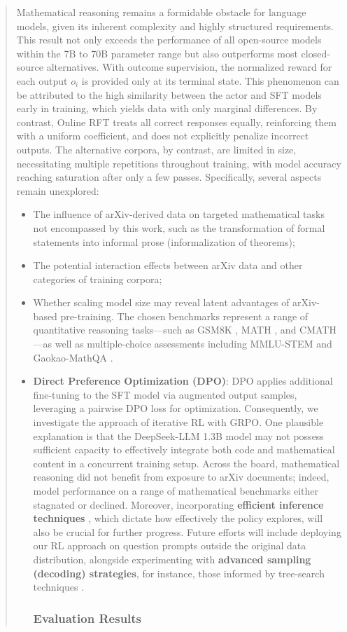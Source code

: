 \begin{abstract}
Mathematical reasoning remains a formidable obstacle for language models, given its inherent complexity and highly structured requirements. This result not only exceeds the performance of all open-source models within the 7B to 70B parameter range but also outperforms most closed-source alternatives. With outcome supervision, the normalized reward for each output $o_i$ is provided only at its terminal state. This phenomenon can be attributed to the high similarity between the actor and SFT models early in training, which yields data with only marginal differences. By contrast, Online RFT treats all correct responses equally, reinforcing them with a uniform coefficient, and does not explicitly penalize incorrect outputs. The alternative corpora, by contrast, are limited in size, necessitating multiple repetitions throughout training, with model accuracy reaching saturation after only a few passes. Specifically, several aspects remain unexplored:

\begin{itemize}[topsep=0pt]
    \item The influence of arXiv-derived data on targeted mathematical tasks not encompassed by this work, such as the transformation of formal statements into informal prose (informalization of theorems);
    \item The potential interaction effects between arXiv data and other categories of training corpora;
    \item Whether scaling model size may reveal latent advantages of arXiv-based pre-training. The chosen benchmarks represent a range of quantitative reasoning tasks—such as GSM8K \citep{gsm8k}, MATH \citep{MATH}, and CMATH \citep{wei2023cmath}—as well as multiple-choice assessments including MMLU-STEM \citep{mmlu} and Gaokao-MathQA \citep{agieval}. \item \textbf{Direct Preference Optimization (DPO)}: DPO applies additional fine-tuning to the SFT model via augmented output samples, leveraging a pairwise DPO loss for optimization. Consequently, we investigate the approach of iterative RL with GRPO. One plausible explanation is that the DeepSeek-LLM 1.3B model may not possess sufficient capacity to effectively integrate both code and mathematical content in a concurrent training setup. Across the board, mathematical reasoning did not benefit from exposure to arXiv documents; indeed, model performance on a range of mathematical benchmarks either stagnated or declined. Moreover, incorporating \textbf{efficient inference techniques} \citep{xia-etal-2023-speculative,leviathan2023fast,kwon2023efficient,xia2024unlocking}, which dictate how effectively the policy explores, will also be crucial for further progress. Future efforts will include deploying our RL approach on question prompts outside the original data distribution, alongside experimenting with \textbf{advanced sampling (decoding) strategies}, for instance, those informed by tree-search techniques \citep{yao2023tree}. \subsubsection{Evaluation Results}


\end{itemize}
\end{abstract}
